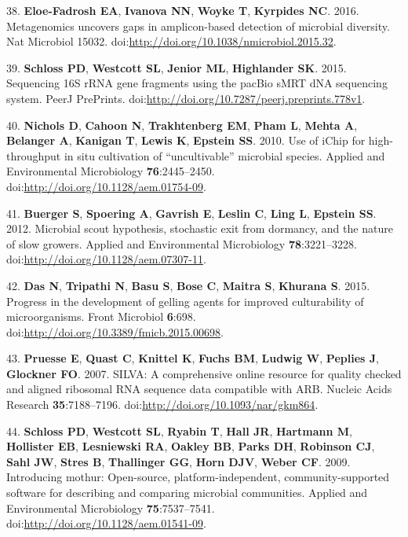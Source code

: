 \documentclass[11pt,]{article}
\begin{document}
38. \textbf{Eloe-Fadrosh EA}, \textbf{Ivanova NN}, \textbf{Woyke T},
\textbf{Kyrpides NC}. 2016. Metagenomics uncovers gaps in amplicon-based
detection of microbial diversity. Nat Microbiol 15032.
doi:\url{http://doi.org/10.1038/nmicrobiol.2015.32}.

39. \textbf{Schloss PD}, \textbf{Westcott SL}, \textbf{Jenior ML},
\textbf{Highlander SK}. 2015. Sequencing 16S rRNA gene fragments using
the pacBio sMRT dNA sequencing system. PeerJ PrePrints.
doi:\url{http://doi.org/10.7287/peerj.preprints.778v1}.

40. \textbf{Nichols D}, \textbf{Cahoon N}, \textbf{Trakhtenberg EM},
\textbf{Pham L}, \textbf{Mehta A}, \textbf{Belanger A}, \textbf{Kanigan
T}, \textbf{Lewis K}, \textbf{Epstein SS}. 2010. Use of iChip for
high-throughput in situ cultivation of ``uncultivable'' microbial
species. Applied and Environmental Microbiology \textbf{76}:2445--2450.
doi:\url{http://doi.org/10.1128/aem.01754-09}.

41. \textbf{Buerger S}, \textbf{Spoering A}, \textbf{Gavrish E},
\textbf{Leslin C}, \textbf{Ling L}, \textbf{Epstein SS}. 2012. Microbial
scout hypothesis, stochastic exit from dormancy, and the nature of slow
growers. Applied and Environmental Microbiology \textbf{78}:3221--3228.
doi:\url{http://doi.org/10.1128/aem.07307-11}.

42. \textbf{Das N}, \textbf{Tripathi N}, \textbf{Basu S}, \textbf{Bose
C}, \textbf{Maitra S}, \textbf{Khurana S}. 2015. Progress in the
development of gelling agents for improved culturability of
microorganisms. Front Microbiol \textbf{6}:698.
doi:\url{http://doi.org/10.3389/fmicb.2015.00698}.

43. \textbf{Pruesse E}, \textbf{Quast C}, \textbf{Knittel K},
\textbf{Fuchs BM}, \textbf{Ludwig W}, \textbf{Peplies J},
\textbf{Glockner FO}. 2007. SILVA: A comprehensive online resource for
quality checked and aligned ribosomal RNA sequence data compatible with
ARB. Nucleic Acids Research \textbf{35}:7188--7196.
doi:\url{http://doi.org/10.1093/nar/gkm864}.

44. \textbf{Schloss PD}, \textbf{Westcott SL}, \textbf{Ryabin T},
\textbf{Hall JR}, \textbf{Hartmann M}, \textbf{Hollister EB},
\textbf{Lesniewski RA}, \textbf{Oakley BB}, \textbf{Parks DH},
\textbf{Robinson CJ}, \textbf{Sahl JW}, \textbf{Stres B},
\textbf{Thallinger GG}, \textbf{Horn DJV}, \textbf{Weber CF}. 2009.
Introducing mothur: Open-source, platform-independent,
community-supported software for describing and comparing microbial
communities. Applied and Environmental Microbiology
\textbf{75}:7537--7541. doi:\url{http://doi.org/10.1128/aem.01541-09}.
\end{document}
